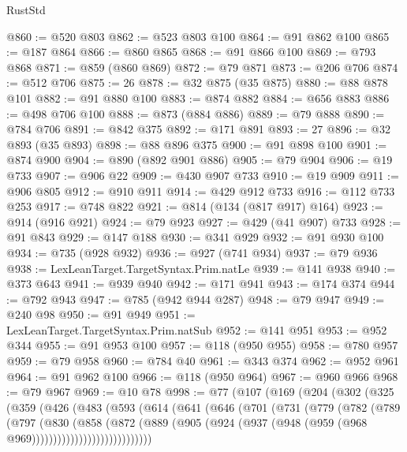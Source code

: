 \begin{lexlean}{RustStd}
\begin{coremodule}
@860 := @520 @803
@862 := @523 @803 @100
@864 := @91 @862 @100
@865 := @187 @864
@866 := @860 @865
@868 := @91 @866 @100
@869 := @793 @868
@871 := @859 (@860 @869)
@872 := @79 @871
@873 := @206 @706
@874 := @512 @706
@875 := 26
@878 := @32 @875 (@35 @875)
@880 := @88 @878 @101
@882 := @91 @880 @100
@883 := @874 @882
@884 := @656 @883
@886 := @498 @706 @100
@888 := @873 (@884 @886)
@889 := @79 @888
@890 := @784 @706
@891 := @842 @375
@892 := @171 @891
@893 := 27
@896 := @32 @893 (@35 @893)
@898 := @88 @896 @375
@900 := @91 @898 @100
@901 := @874 @900
@904 := @890 (@892 @901 @886)
@905 := @79 @904
@906 := @19 @733
@907 := @906 @22
@909 := @430 @907 @733
@910 := @19 @909
@911 := @906 @805
@912 := @910 @911
@914 := @429 @912 @733
@916 := @112 @733 @253
@917 := @748 @822
@921 := @814 (@134 (@817 @917) @164)
@923 := @914 (@916 @921)
@924 := @79 @923
@927 := @429 (@41 @907) @733
@928 := @91 @843
@929 := @147 @188
@930 := @341 @929
@932 := @91 @930 @100
@934 := @735 (@928 @932)
@936 := @927 (@741 @934)
@937 := @79 @936
@938 := LexLeanTarget.TargetSyntax.Prim.natLe
@939 := @141 @938
@940 := @373 @643
@941 := @939 @940
@942 := @171 @941
@943 := @174 @374
@944 := @792 @943
@947 := @785 (@942 @944 @287)
@948 := @79 @947
@949 := @240 @98
@950 := @91 @949
@951 := LexLeanTarget.TargetSyntax.Prim.natSub
@952 := @141 @951
@953 := @952 @344
@955 := @91 @953 @100
@957 := @118 (@950 @955)
@958 := @780 @957
@959 := @79 @958
@960 := @784 @40
@961 := @343 @374
@962 := @952 @961
@964 := @91 @962 @100
@966 := @118 (@950 @964)
@967 := @960 @966
@968 := @79 @967
@969 := @10 @78
@998 := @77
    (@107
      (@169
        (@204
          (@302
            (@325
              (@359
                (@426
                  (@483
                    (@593
                      (@614
                        (@641
                          (@646
                            (@701
                              (@731
                                (@779
                                  (@782
                                    (@789
                                      (@797
                                        (@830
                                          (@858
                                            (@872
                                              (@889
                                                (@905
                                                  (@924
                                                    (@937
                                                      (@948
                                                        (@959 (@968 @969))))))))))))))))))))))))))))

\end{coremodule}
\end{lexlean}
